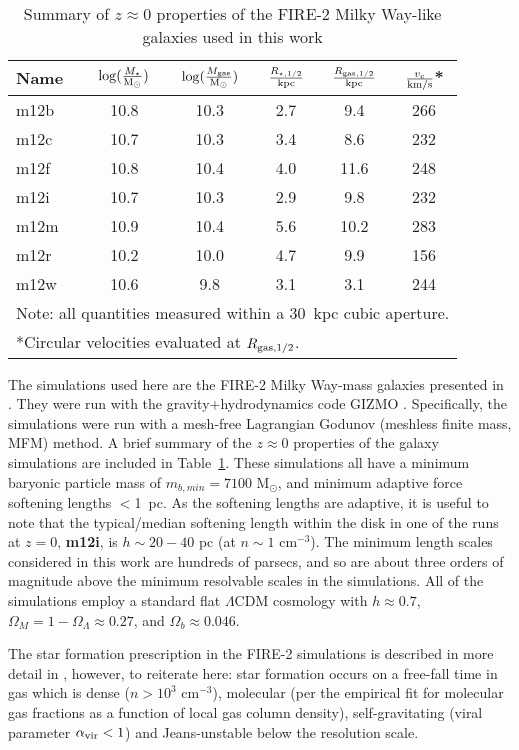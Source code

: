 \documentclass[usletter,fleqn,usenatbib]{mnras}
\begin{document}
\begin{table}\caption{Summary of $z\approx0$ properties of the FIRE-2 Milky Way-like galaxies used in this work}\label{table:galprops}
\begin{tabular}{lccccc}
\hline
Name & $\log(\frac{M_\star}{{\rm M_\odot}})$ & $\log(\frac{M_{\rm gas}}{{\rm M_\odot}})$ & $\frac{R_{\star,1/2}}{\rm kpc}$& $\frac{R_{\rm gas,1/2}}{\rm kpc}$ & $\frac{v_c}{\rm km/s}$* \\
 \hline
m12b  & 10.8 & 10.3 & 2.7 & 9.4 & 266 \\
m12c  & 10.7 & 10.3 & 3.4 & 8.6 & 232 \\
m12f   & 10.8 & 10.4 & 4.0 & 11.6 & 248 \\
m12i   & 10.7 & 10.3 & 2.9 & 9.8 & 232 \\
m12m & 10.9 & 10.4 & 5.6 & 10.2 & 283 \\
m12r   & 10.2 & 10.0 & 4.7 & 9.9 & 156 \\
m12w  & 10.6 & 9.8 & 3.1 & 3.1& 244 \\
 \hline
\multicolumn{6}{l}{Note: all quantities measured within a 30~kpc cubic aperture.}\\
\multicolumn{6}{l}{*Circular velocities evaluated at $R_{\rm gas,1/2}$.}\\
\end{tabular}
\end{table}
The simulations used here are the FIRE-2 Milky Way-mass galaxies presented in \citep{Hopkins2018:fire}.  They were run with the gravity+hydrodynamics code {\scriptsize GIZMO} \citep{Hopkins2015:gizmo}.  Specifically, the simulations were run with a mesh-free Lagrangian Godunov (meshless finite mass, MFM) method.  A brief summary of the $z \approx 0$ properties of the galaxy simulations are included in Table~\ref{table:galprops}.  These simulations all have a minimum baryonic particle mass of $m_{b,min} = 7100$ M$_\odot$, and minimum adaptive force softening lengths $<$1~pc.  As the softening lengths are adaptive, it is useful to note that the typical/median softening length within the disk in one of the runs at $z=0$, \textbf{m12i}, is $h\sim 20-40$ pc (at $n\sim 1$ cm$^{-3}$). The minimum length scales considered in this work are hundreds of parsecs, and so are about three orders of magnitude above the minimum resolvable scales in the simulations. All of the simulations employ a standard flat $\Lambda$CDM cosmology with $h \approx 0.7$, $\Omega_M = 1 - \Omega_\Lambda \approx 0.27$, and $\Omega_b \approx 0.046$.

The star formation prescription in the FIRE-2 simulations is described in more detail in \citet{Hopkins2018:fire}, however, to reiterate here: star formation occurs on a free-fall time in gas which is dense ($n >10^3$ cm$^{-3}$), molecular (per the \citet{Krumholz2011} empirical fit for molecular gas fractions as a function of local gas column density), self-gravitating (viral parameter $\alpha_{\rm vir} < 1$) and Jeans-unstable below the resolution scale.
\end{document}
